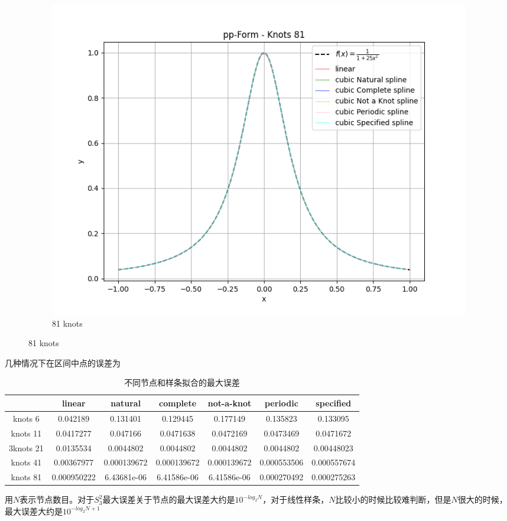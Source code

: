 \documentclass[UTF8]{ctexart}
\begin{document}
	\begin{figure}[H]
		\centering
		\begin{subfigure}[b]{0.45\textwidth}
			\centering
			\includegraphics[width=\textwidth]{../figure/A_5.png}
			\caption{81 knots}
			\label{fig:image1}
		\end{subfigure}
	\end{figure}
	几种情况下在区间中点的误差为
	\begin{table}[H]
		\centering
		\begin{tabular}{|c|c|c|c|c|c|c|}
			\hline
			 & linear & natural & complete & not-a-knot & periodic & specified \\
			\hline
			knots 6 & 0.042189 & 0.131401 & 0.129445 & 0.177149 & 0.135823 & 0.133095 \\
			\hline
			knots 11 & 0.0417277 & 0.047166 & 0.0471638 & 0.0472169 & 0.0473469 & 0.0471672 \\
			\hline
			3knots 21 & 0.0135534 & 0.0044802 & 0.0044802 & 0.0044802 & 0.0044802 & 0.00448023 \\
			\hline
			knots 41 & 0.00367977 & 0.000139672 & 0.000139672 & 0.000139672 & 0.000553506 & 0.000557674 \\
			\hline
			knots 81 & 0.000950222 & 6.43681e-06 & 6.41586e-06 & 6.41586e-06 & 0.000270492 & 0.000275263 \\
			\hline
		\end{tabular}
		\caption{不同节点和样条拟合的最大误差}
	\end{table}
	用$N$表示节点数目。对于$S_3^2$最大误差关于节点的最大误差大约是$10^{-log_2N}$，对于线性样条，$N$比较小的时候比较难判断，但是$N$很大的时候，最大误差大约是$10^{-log_2N+1}$
	
\end{document}
